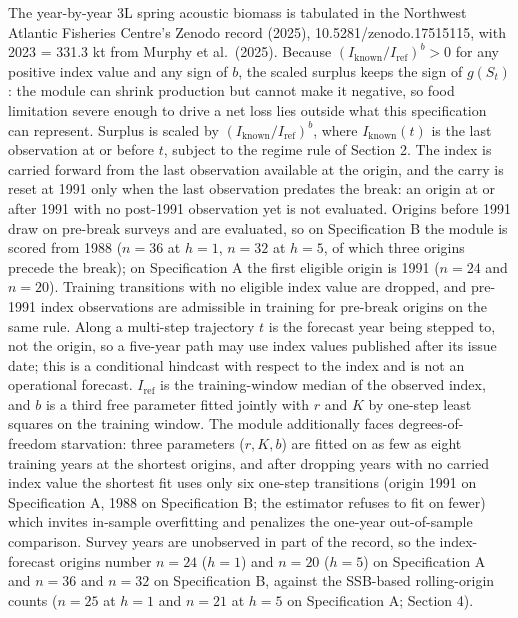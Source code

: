 \documentclass[11pt]{article}
\begin{document}
The year-by-year 3L spring acoustic biomass is tabulated in the
Northwest Atlantic Fisheries Centre's Zenodo record (2025),
10.5281/zenodo.17515115, with 2023 = 331.3 kt from Murphy et al.~(2025).
Because \((I_{\mathrm{known}}/I_{\mathrm{ref}})^{b}>0\) for any
positive index value and any sign of \(b\), the scaled surplus keeps the
sign of \(g(S_t)\): the module can shrink production but cannot make it
negative, so food limitation severe enough to drive a net loss lies
outside what this specification can represent. Surplus is scaled by
\((I_{\mathrm{known}}/I_{\mathrm{ref}})^{b}\),
where \(I_{\mathrm{known}}(t)\) is the last observation at or before
\(t\), subject to the regime rule of Section 2. The index is carried forward from the last observation available at the
origin, and the carry is reset at 1991 only when the last observation
predates the break: an origin at or after 1991 with no post-1991
observation yet is not evaluated. Origins before 1991 draw on pre-break
surveys and are evaluated, so on Specification B the module is scored
from 1988 (\(n=36\) at \(h=1\), \(n=32\) at \(h=5\), of which three
origins precede the break); on Specification A the first eligible origin
is 1991 (\(n=24\) and \(n=20\)). Training transitions with no eligible
index value are dropped, and pre-1991 index observations are admissible
in training for pre-break origins on the same rule. Along a multi-step trajectory \(t\) is the forecast
year being stepped to, not the origin, so a five-year path may use index
values published after its issue date; this is a conditional hindcast
with respect to the index and is not an operational forecast. \(I_{\mathrm{ref}}\) is the training-window median of the
observed index, and \(b\) is a third free parameter fitted jointly with
\(r\) and \(K\) by one-step least squares on the training window. The
module additionally faces degrees-of-freedom starvation: three
parameters (\(r, K, b\)) are fitted on as few as eight training years at
the shortest origins, and after dropping years with no carried index
value the shortest fit uses only six one-step transitions (origin 1991
on Specification A, 1988 on Specification B; the estimator refuses to
fit on fewer) which invites in-sample overfitting and penalizes
the one-year out-of-sample comparison. Survey years are unobserved in
part of the record, so the index-forecast origins number \(n=24\)
(\(h=1\)) and \(n=20\) (\(h=5\)) on Specification A and \(n=36\) and
\(n=32\) on Specification B, against the SSB-based rolling-origin counts
(\(n=25\) at \(h=1\) and \(n=21\) at \(h=5\) on Specification A; Section
4).
\end{document}
